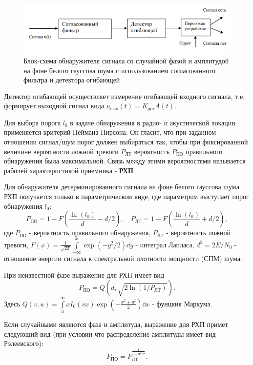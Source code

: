 \begin{figure}[h!]
	\centering
	\includegraphics[width =0.8\linewidth]{imgs/scheme3.png}
	\caption{Блок-схема обнаружителя сигнала со случайной фазой и амплитудой на фоне
    белого гауссова шума с использованием согласованного фильтра и детектора огибающей}
	\label{fig:scheme3}
\end{figure}

Детектор огибающей осуществляет измерение огибающей входного сигнала,
т.е. формирует выходной сигнал вида $u_{\text{вых}}(t) = K_{\text{дет}}A(t)$.

Для выбора порога $l_0$ в задаче обнаружения в радио- и акустической
локации применяется критерий Неймана-Пирсона. Он гласит, что
при заданном отношении сигнал/шум порог должен выбираться так, чтобы при
фиксированной величине вероятности ложной тревоги $P_\text{ЛТ}$ вероятность $P_\text{ПО}$ правильного
обнаружения была максимальной. Связь между этими вероятностями
называется рабочей характеристикой приемника - \textbf{РХП}.
 
Для обнаружителя детерминированного сигнала на фоне белого гауссова шума РХП получается только в параметрическом виде,
где параметром выступает порог обнаружения $l_0$:
\begin{equation}
    P_\text{ПО} = 1- F\left(\frac{\ln(l_0)}{d} - d/2\right), \quad
    P_\text{ЛТ} = 1 - F\left(\frac{\ln(l_0)}{d} + d/2\right),
    \label{eq:laplace}
\end{equation}
где $P_\text{ПО}$ - вероятность правильного обнаружения, $P_\text{ЛТ}$ - вероятность ложной тревоги,
$F(x) = \frac{1}{\sqrt{2\pi}}\int\limits_{-\infty}^{x}\exp(-y^2/2)\dd y$ - интеграл Лапласа,
$d^2 = 2 E/N_0$ - отношение энергии сигнала к спектральной плотности мощности (СПМ) шума. 

При неизвестной фазе выражение для РХП имеет вид
\begin{equation}
    P_\text{ПО} = Q(d, \sqrt{2 \ln(1/P_\text{ЛТ})}).
    \label{eq:marqum}
\end{equation}
Здесь  $Q(v,u) = \int \limits_{u}^{\infty} x I_0 (v x) \exp \left(-\frac{x^2 + y^2}{2}\right) \dd x$ - 
фунцкия Маркума.

Если случайными являются фаза и амплитуда, выражение для РХП примет следующий вид (при условии что
распределение амплитуды имеет вид Рэлеевского):
\begin{equation}
    P_\text{ПО} = P_\text{ЛТ}^{\frac{1}{1+d^2/2}}.
    \label{eq:theory}
\end{equation}

